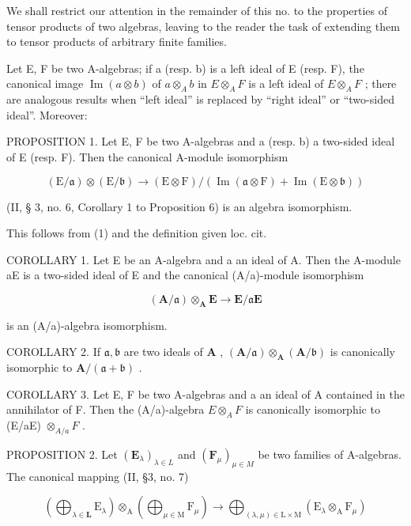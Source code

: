 We shall restrict our attention in the remainder of this no. to the properties of tensor products of two algebras, leaving to the reader the task of extending them to tensor products of arbitrary finite families.

Let E, F be two A-algebras; if a (resp. b) is a left ideal of E (resp. F), the canonical image \(\operatorname{Im}(a \otimes b)\) of \(a \otimes_{A} b\) in \(E \otimes_{A} F\) is a left ideal of \(E \otimes_{A} F\) ; there are analogous results when ``left ideal'' is replaced by ``right ideal'' or ``two-sided ideal''. Moreover:

PROPOSITION 1. Let E, F be two A-algebras and a (resp. b) a two-sided ideal of E (resp. F). Then the canonical A-module isomorphism

\[
(\mathrm{E} / \mathfrak {a}) \otimes (\mathrm{E} / \mathfrak {b}) \rightarrow (\mathrm{E} \otimes \mathrm{F}) / (\operatorname{Im} (\mathfrak {a} \otimes \mathrm{F}) + \operatorname{Im} (\mathrm{E} \otimes \mathfrak {b}))
\]

(II, § 3, no. 6, Corollary 1 to Proposition 6) is an algebra isomorphism.

This follows from (1) and the definition given loc. cit.

COROLLARY 1. Let E be an A-algebra and a an ideal of A. Then the A-module aE is a two-sided ideal of E and the canonical (A/a)-module isomorphism

\[
(\mathbf {A} / \mathfrak {a}) \otimes_ {\mathbf {A}} \mathbf {E} \rightarrow \mathbf {E} / \mathfrak {a} \mathbf {E}
\]

is an (A/a)-algebra isomorphism.

COROLLARY 2. If \(\mathfrak{a},\mathfrak{b}\) are two ideals of \(\mathbf{A}\) , \((\mathbf{A} / \mathfrak{a})\otimes_{\mathbf{A}}(\mathbf{A} / \mathfrak{b})\) is canonically isomorphic to \(\mathbf{A} / (\mathfrak{a} + \mathfrak{b})\) .

COROLLARY 3. Let E, F be two A-algebras and a an ideal of A contained in the annihilator of F. Then the (A/a)-algebra \(E \otimes_{A} F\) is canonically isomorphic to (E/aE) \(\otimes_{A/a} F\) .

PROPOSITION 2. Let \((\mathbf{E}_{\lambda})_{\lambda \in L}\) and \((\mathbf{F}_{\mu})_{\mu \in M}\) be two families of A-algebras. The canonical mapping (II, §3, no. 7)

\[
\left(\bigoplus_ {\lambda \in \mathbf {L}} \mathrm{E} _ {\lambda}\right) \otimes_ {\mathrm{A}} \left(\bigoplus_ {\mu \in \mathrm{M}} \mathrm{F} _ {\mu}\right)\rightarrow \bigoplus_ {(\lambda , \mu) \in \mathrm{L} \times \mathrm{M}} \left(\mathrm{E} _ {\lambda} \otimes_ {\mathrm{A}} \mathrm{F} _ {\mu}\right)
\]

